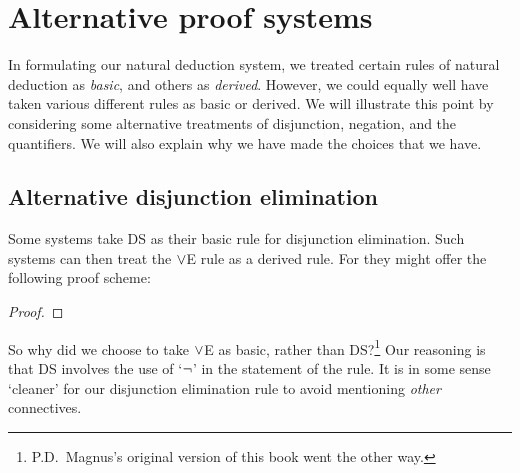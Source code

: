 
\chapter{Alternative proof systems}
In formulating our natural deduction system, we treated certain rules of natural deduction as \emph{basic}, and others as \emph{derived}. However, we could equally well have taken various different rules as basic or derived. We will illustrate this point by considering some alternative treatments of disjunction, negation, and the quantifiers. We will also explain why we have made the choices that we have.


\section{Alternative disjunction elimination}
Some systems take DS as their basic rule for disjunction elimination. Such systems can then treat the $\vee$E rule as a derived rule. For they might offer the following proof scheme: 
	\begin{proof}
		\LEM
		\open
			 {}
		\close
		\open
		\close
		\open
		\close
		\open
		\open
		\close
	\close
\end{proof}
So why did we choose to take $\vee$E as basic, rather than DS?\footnote{P.D.\ Magnus's original version of this book went the other way.} Our reasoning is that DS involves the use of `$\neg$' in the statement of the rule. It is in some sense `cleaner' for our disjunction elimination rule to avoid mentioning \emph{other} connectives. 


